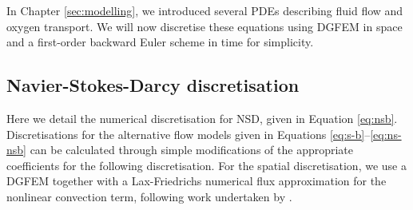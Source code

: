         In Chapter \ref{sec:modelling}, we introduced several PDEs describing fluid flow and oxygen transport. We will now discretise these equations using DGFEM in space and a first-order backward Euler scheme in time for simplicity.

        \subsection{Navier-Stokes-Darcy discretisation} \label{sec:numerical-methods:equation-discretisations:nsd}
            Here we detail the numerical discretisation for NSD, given in Equation \eqref{eq:nsb}. Discretisations for the alternative flow models given in Equations \eqref{eq:s-b}--\eqref{eq:ns-nsb} can be calculated through simple modifications of the appropriate coefficients for the following discretisation. For the spatial discretisation, we use a DGFEM together with a Lax-Friedrichs numerical flux approximation for the nonlinear convection term, following work undertaken by \citeauthor{cliffeAdaptiveDiscontinuousGalerkin2010} \cite{cliffeAdaptiveDiscontinuousGalerkin2010}. 
            
